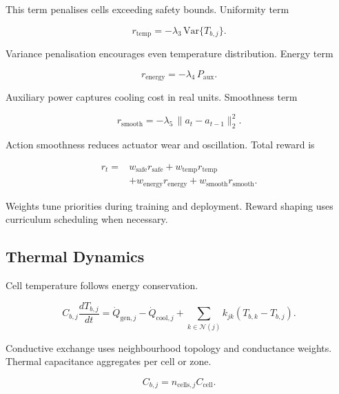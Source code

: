 \documentclass{article}
\begin{document}
This term penalises cells exceeding safety bounds.
Uniformity term

\begin{equation}
r_{\mathrm{temp}} =
-\lambda_3\,\mathrm{Var}\{T_{b,j}\}.
\end{equation}

Variance penalisation encourages even temperature distribution.
Energy term

\begin{equation}
r_{\mathrm{energy}} =
-\lambda_4\,P_{\mathrm{aux}}.
\end{equation}

Auxiliary power captures cooling cost in real units.
Smoothness term

\begin{equation}
r_{\mathrm{smooth}} =
-\lambda_5\,\lVert a_t - a_{t-1}\rVert_2^2.
\end{equation}

Action smoothness reduces actuator wear and oscillation.
Total reward is

\begin{equation}
\begin{aligned}
r_t ={}&
w_{\mathrm{safe}} r_{\mathrm{safe}}
+ w_{\mathrm{temp}} r_{\mathrm{temp}} \\
&+ w_{\mathrm{energy}} r_{\mathrm{energy}}
+ w_{\mathrm{smooth}} r_{\mathrm{smooth}}.
\end{aligned}
\end{equation}

Weights tune priorities during training and deployment.
Reward shaping uses curriculum scheduling when necessary.

\subsection{Thermal Dynamics}

Cell temperature follows energy conservation.

\begin{equation}
C_{b,j}\frac{dT_{b,j}}{dt}
=
\dot Q_{\mathrm{gen},j}
-
\dot Q_{\mathrm{cool},j}
+
\sum_{k\in\mathcal{N}(j)}
k_{jk}(T_{b,k}-T_{b,j}).
\end{equation}

Conductive exchange uses neighbourhood topology and conductance weights.
Thermal capacitance aggregates per cell or zone.

\begin{equation}
C_{b,j} =
n_{\mathrm{cells},j} C_{\mathrm{cell}}.
\end{equation}
\end{document}
